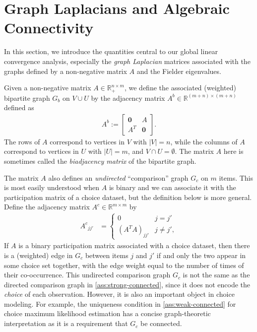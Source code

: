 \section{Graph Laplacians and Algebraic Connectivity}
\label{subsec:graph-laplacian}
In this section, we introduce the quantities central to our global linear convergence analysis, especially the \emph{graph Laplacian} matrices associated with the graphs defined by a non-negative matrix $A$ and the Fielder eigenvalues.

Given a non-negative matrix $A\in \mathbb{R}_+^{n\times m}$, we define the associated (weighted) bipartite graph $G_b$ on $V\cup U$ by the adjacency matrix $A^b \in \mathbb{R}^{(m+n)\times (m+n)}$ defined as
\begin{align*}
    A^b := \begin{bmatrix}\mathbf{0} & {A}\\
{A}^{T} & \mathbf{0}
\end{bmatrix}.	
\end{align*}
The rows of $A$ correspond to vertices in $V$
with $|V|=n$, while the columns of $A$ correspond to vertices in
$U$ with $|U|=m$, and $V\cap U=\emptyset$. The matrix $A$ here is sometimes called the \emph{biadjacency matrix} of the bipartite graph.

The matrix $A$ also defines
an \emph{undirected} ``comparison'' graph $G_c$ on $m$ items. This is most easily understood when $A$ is binary and we can associate it with the participation matrix of a choice dataset, but the definition below is more general. Define the adjacency matrix $A^c \in \mathbb{R}^{m\times m}$ by
\begin{align*}
{A^c}_{jj'} & =\begin{cases}
0 & j=j'\\
(A^{T}A)_{jj'} & j\neq j',
\end{cases}
\end{align*}
If $A$ is a binary participation matrix associated with a choice dataset, then there is a (weighted) edge in $G_{c}$ between items $j$ and $j'$
if and only the two appear in some choice set together, with the edge
weight equal to the number of times of their co-occurrence. This undirected comparison graph $G_c$ is not the same as the directed comparison graph in \cref{ass:strong-connected}, since it does not encode the \emph{choice} of each observation. However, it is also an important object in choice modeling. For example, the uniqueness condition in \cref{ass:weak-connected} for choice maximum likelihood estimation has a concise graph-theoretic interpretation as it is a requirement that $G_c$ be connected.

